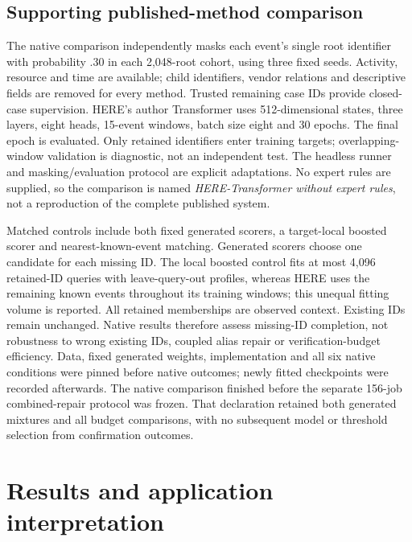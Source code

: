 \documentclass[11pt]{article}
\begin{document}

\subsection{Supporting published-method comparison}
The native comparison independently masks each event's single root identifier with probability .30 in each 2,048-root cohort, using three fixed seeds. Activity, resource and time are available; child identifiers, vendor relations and descriptive fields are removed for every method. Trusted remaining case IDs provide closed-case supervision. HERE's author Transformer uses 512-dimensional states, three layers, eight heads, 15-event windows, batch size eight and 30 epochs. The final epoch is evaluated. Only retained identifiers enter training targets; overlapping-window validation is diagnostic, not an independent test. The headless runner and masking/evaluation protocol are explicit adaptations. No expert rules are supplied, so the comparison is named \emph{HERE-Transformer without expert rules}, not a reproduction of the complete published system.

Matched controls include both fixed generated scorers, a target-local boosted scorer and nearest-known-event matching. Generated scorers choose one candidate for each missing ID. The local boosted control fits at most 4,096 retained-ID queries with leave-query-out profiles, whereas HERE uses the remaining known events throughout its training windows; this unequal fitting volume is reported. All retained memberships are observed context. Existing IDs remain unchanged. Native results therefore assess missing-ID completion, not robustness to wrong existing IDs, coupled alias repair or verification-budget efficiency. Data, fixed generated weights, implementation and all six native conditions were pinned before native outcomes; newly fitted checkpoints were recorded afterwards. The native comparison finished before the separate 156-job combined-repair protocol was frozen. That declaration retained both generated mixtures and all budget comparisons, with no subsequent model or threshold selection from confirmation outcomes.

\section{Results and application interpretation}

\end{document}
